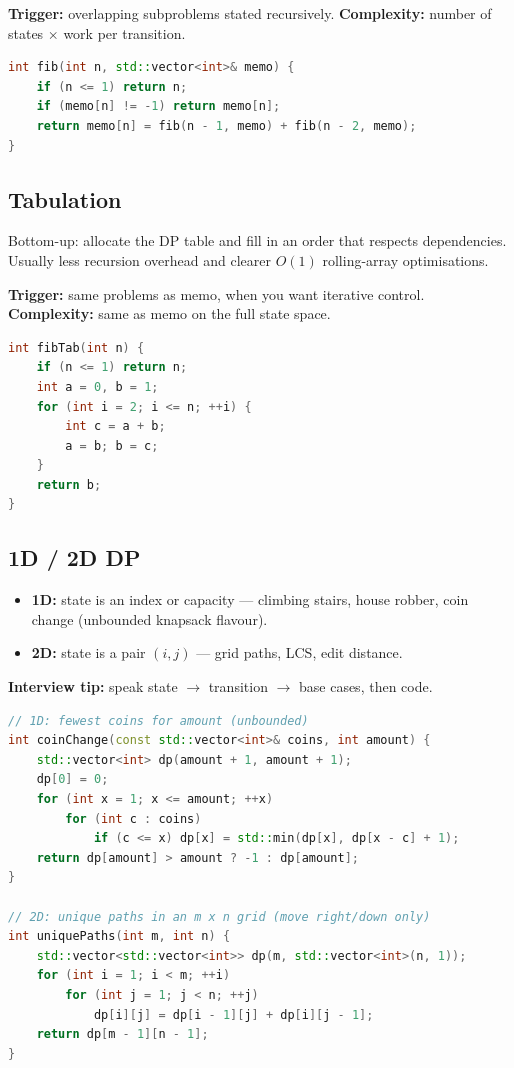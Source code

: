 \textbf{Trigger:} overlapping subproblems stated recursively.
\newline
\textbf{Complexity:} number of states $\times$ work per transition.

\begin{lstlisting}[language=C++]
int fib(int n, std::vector<int>& memo) {
    if (n <= 1) return n;
    if (memo[n] != -1) return memo[n];
    return memo[n] = fib(n - 1, memo) + fib(n - 2, memo);
}
\end{lstlisting}

\subsection{Tabulation}
\label{subsec:pat-tab}
Bottom-up: allocate the DP table and fill in an order that respects dependencies.
Usually less recursion overhead and clearer $O(1)$ rolling-array optimisations.

\textbf{Trigger:} same problems as memo, when you want iterative control.
\newline
\textbf{Complexity:} same as memo on the full state space.

\begin{lstlisting}[language=C++]
int fibTab(int n) {
    if (n <= 1) return n;
    int a = 0, b = 1;
    for (int i = 2; i <= n; ++i) {
        int c = a + b;
        a = b; b = c;
    }
    return b;
}
\end{lstlisting}

\subsection{1D / 2D DP}
\label{subsec:pat-1d2d}
\begin{itemize}
    \item \textbf{1D:} state is an index or capacity --- climbing stairs, house robber,
          coin change (unbounded knapsack flavour).
    \item \textbf{2D:} state is a pair $(i,j)$ --- grid paths, LCS, edit distance.
\end{itemize}
\par\noindent\textbf{Interview tip:} speak state $\rightarrow$ transition $\rightarrow$
base cases, then code.

\begin{lstlisting}[language=C++]
// 1D: fewest coins for amount (unbounded)
int coinChange(const std::vector<int>& coins, int amount) {
    std::vector<int> dp(amount + 1, amount + 1);
    dp[0] = 0;
    for (int x = 1; x <= amount; ++x)
        for (int c : coins)
            if (c <= x) dp[x] = std::min(dp[x], dp[x - c] + 1);
    return dp[amount] > amount ? -1 : dp[amount];
}

// 2D: unique paths in an m x n grid (move right/down only)
int uniquePaths(int m, int n) {
    std::vector<std::vector<int>> dp(m, std::vector<int>(n, 1));
    for (int i = 1; i < m; ++i)
        for (int j = 1; j < n; ++j)
            dp[i][j] = dp[i - 1][j] + dp[i][j - 1];
    return dp[m - 1][n - 1];
}
\end{lstlisting}

